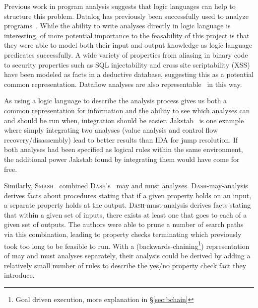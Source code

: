 Previous work in program analysis suggests that logic languages can help to structure this problem.
Datalog has previously been successfully used to analyze programs~\cite{lam2005,brumley2006,alpuente2011,doop1,bddbddb}.
While the ability to write analyses directly in logic language is interesting, of more potential importance to the feasability of this project is that they were able to model both their input and output knowledge as logic language predicates successfully.
A wide variety of properties from aliasing in binary code~\cite{brumley2006} to security properties such as SQL injectability and cross site scriptability (XSS)~\cite{lam2005} have been modeled as facts in a deductive database, suggesting this as a potential common representation.
Dataflow analyses are also representable~\cite{mcallester2002} in this way.

As using a logic language to describe the analysis process gives us both a common representation for information and the ability to see which analyses can and should be run when, integration should be easier.
Jakstab~\cite{jakstab} is one example where simply integrating two analyses (value analysis and control flow recovery/disassembly) lead to better results than IDA\cite{ida} for jump resolution.
If both analyses had been specified as logical rules within the same environment, the additional power Jakstab found by integrating them would have come for free.

Similarly, \textsc{Smash}~\cite{smash} combined \textsc{Dash}'s~\cite{dash} may and must analyses.
\textsc{Dash}-may-analysis derives facts about procedures stating that if a given property holds on an input, a separate property holds at the output.
\textsc{Dash}-must-analysis derives facts stating that within a given set of inputs, there exists at least one that goes to each of a given set of outputs.
The authors were able to prune a number of search paths via this combination, leading to property checks terminating which previously took too long to be feasible to run.
With a (backwards-chaining\footnote{Goal driven execution, more explanation in \S\ref{sec:bchain}}) representation of may and must analyses separately, their analysis could be derived by adding a relatively small number of rules to describe the yes/no property check fact they introduce.

